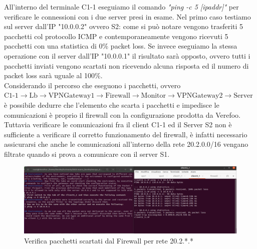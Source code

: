 All'interno del terminale C1-1 eseguiamo il comando \textit{"ping -c 5 [ipaddr]"} per verificare le connessioni con i due server presi in esame.
Nel primo caso testiamo sul server dall'IP "10.0.0.2" ovvero S2: come si può notare vengono trasferiti 5 pacchetti col protocollo ICMP e contemporaneamente vengono
ricevuti 5 pacchetti con una statistica di 0\% packet loss. Se invece eseguiamo la stessa operazione con il server dall'IP "10.0.0.1" il risultato sarà opposto, ovvero tutti
i pacchetti inviati vengono scartati non ricevendo alcuna risposta ed il numero di packet loss sarà uguale al 100\%.\\
Considerando il percorso che eseguono i pacchetti, ovvero\\
 $ \text{C1-1} \rightarrow \text{Lb} \rightarrow \text{VPNGateway1} \rightarrow \text{Firewall} \rightarrow \text{Monitor} \rightarrow \text{VPNGateway2} \rightarrow \text{Server}$
è possibile dedurre che l'elemento che scarta i pacchetti e impedisce le comunicazioni è proprio il firewall con la configurazione prodotta da Verefoo.\\
Tuttavia verificare le comunicazioni fra il client C1-1 ed il Server S2 non è sufficiente a verificare il corretto funzionamento del firewall, è infatti necessario assicurarsi che anche
le comunicazioni all'interno della rete 20.2.0.0/16 vengano filtrate quando si prova a comunicare con il server S1. 
\begin{figure}[H] 
    \centering
    \includegraphics[width=1\textwidth]{(2)FirewallDiscard2.png} 
    \caption{Verifica pacchetti scartati dal Firewall per rete 20.2.*.*}
    \label{fig:Verifica2}
\end{figure}

